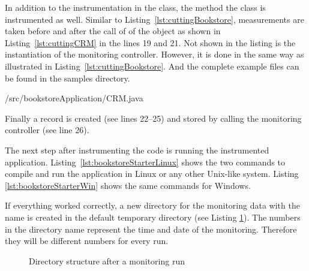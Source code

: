 \noindent In addition to the instrumentation in the  class, the  method the  class is instrumented as well. Similar to Listing~\ref{lst:cuttingBookstore}, measurements are taken before and after the call of  of the  object as shown in Listing~\ref{lst:cuttingCRM} in the lines 19 and 21. Not shown in the listing is the instantiation of the monitoring controller. However, it is done in the same way as illustrated in Listing~\ref{lst:cuttingBookstore}. And the complete example files can be found in the samples directory.

\setJavaCodeListing
%
{\manualInstrumentedBookstoreApplicationDir/src/bookstoreApplication/CRM.java}

\noindent Finally a record is created (see lines 22--25) and stored by calling the monitoring controller (see line 26).

The next step after instrumenting the code is running the instrumented application. Listing~\ref{lst:bookstoreStarterLinux} shows the two commands to compile and run the application in Linux or any other Unix-like system. Listing \ref{lst:bookstoreStarterWin} shows the same commands for Windows.

\setBashListing 		
	




If everything worked correctly, a new directory for the monitoring data with the name  is created in the default temporary directory (see Listing \ref{fig:logtree}). The numbers in the directory name represent the time and date of the monitoring. Therefore they will be different numbers for every run.

\begin{figure}[H]
\begin{graybox}
\end{graybox}
\caption{Directory structure after a monitoring run}
\label{fig:logtree}
\end{figure}

